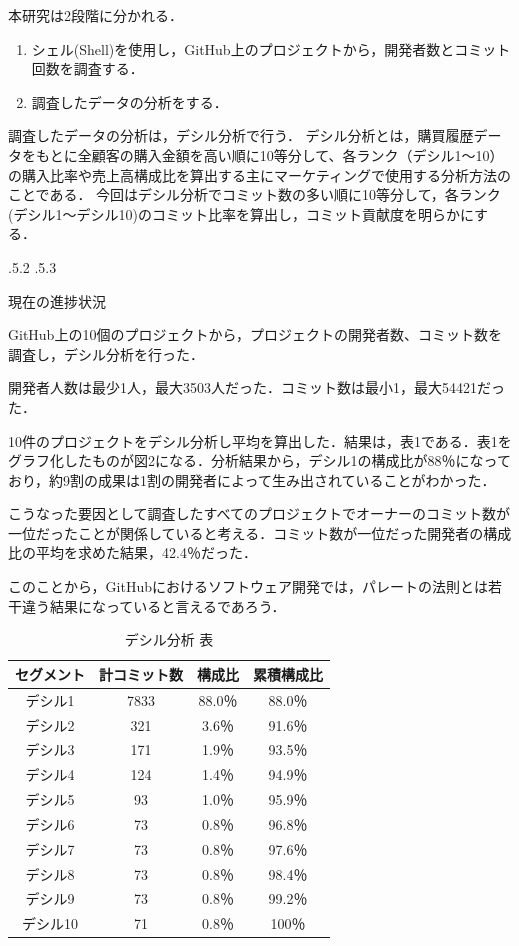 \documentclass[uplatex]{jsarticle}
\makeatletter
\renewcommand{\section}{%
    \if@slide\clearpage\fi
    \@startsection{section}{1}{\z@}%
    {\Cvs \@plus.5\Cdp \@minus.2\Cdp}%
    {.5\Cvs \@plus.3\Cdp}%
    {\normalfont\raggedright}}
\newcommand{\tblcaption}[1]{\def\@captype{table}\caption{#1}}
\makeatother
\begin{document}
本研究は2段階に分かれる．
\begin{enumerate}
\item シェル(Shell)を使用し，GitHub上のプロジェクトから，開発者数とコミット回数を調査する．
\item 調査したデータの分析をする．
\end{enumerate}


調査したデータの分析は，デシル分析で行う．
デシル分析とは，購買履歴データをもとに全顧客の購入金額を高い順に10等分して、各ランク（デシル1～10）の購入比率や売上高構成比を算出する主にマーケティングで使用する分析方法のことである\cite{decyl01}．
今回はデシル分析でコミット数の多い順に10等分して，各ランク(デシル1～デシル10)のコミット比率を算出し，コミット貢献度を明らかにする．




\section{現在の進捗状況}



GitHub上の10個のプロジェクトから，プロジェクトの開発者数、コミット数を調査し，デシル分析を行った．

開発者人数は最少1人，最大3503人だった．コミット数は最小1，最大54421だった．

10件のプロジェクトをデシル分析し平均を算出した．結果は，表1である．表1をグラフ化したものが図2になる．分析結果から，デシル1の構成比が88％になっており，約9割の成果は1割の開発者によって生み出されていることがわかった．

こうなった要因として調査したすべてのプロジェクトでオーナーのコミット数が一位だったことが関係していると考える．コミット数が一位だった開発者の構成比の平均を求めた結果，42.4％だった．

このことから，GitHubにおけるソフトウェア開発では，パレートの法則とは若干違う結果になっていると言えるであろう．



\begin{table}[h] 
\centering
 \tblcaption{デシル分析 表} \label{デシル分析}
\begin{tabular}{|c|c|c|c|}
\hline
セグメント & 計コミット数 & 構成比 & 累積構成比 \\
\hline
  デシル1 & 7833 & 88.0％ & 88.0％ \\
  デシル2 & 321 & 3.6％ & 91.6％ \\
  デシル3 & 171 & 1.9％ & 93.5％ \\
  デシル4 & 124 & 1.4％ & 94.9％ \\
  デシル5 & 93 & 1.0％ & 95.9％ \\
  デシル6 & 73 & 0.8％ & 96.8％ \\
  デシル7 & 73 & 0.8％ & 97.6％ \\
  デシル8 & 73 & 0.8％ & 98.4％ \\
  デシル9 & 73 & 0.8％ & 99.2％ \\
  デシル10 & 71 & 0.8％ & 100％ \\
\hline
\end{tabular}\end{table}
\end{document}
